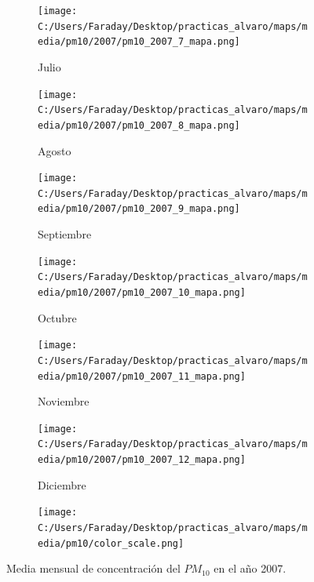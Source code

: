 \documentclass[12pt]{article}
\begin{document}
\begin{figure}[H]
\begin{subfigure}[H]{0.15\textwidth}
\texttt{[image: C:/Users/Faraday/Desktop/practicas\_alvaro/maps/media/pm10/2007/pm10\_2007\_7\_mapa.png]}
\captionsetup{labelformat=empty}
\caption{Julio}
\label{fig:map-pm10-2007-7}
\end{subfigure}
%
\begin{subfigure}[H]{0.15\textwidth}
\texttt{[image: C:/Users/Faraday/Desktop/practicas\_alvaro/maps/media/pm10/2007/pm10\_2007\_8\_mapa.png]}
\captionsetup{labelformat=empty}
\caption{Agosto}
\label{fig:map-pm10-2007-8}
\end{subfigure}
%
\begin{subfigure}[H]{0.15\textwidth}
\texttt{[image: C:/Users/Faraday/Desktop/practicas\_alvaro/maps/media/pm10/2007/pm10\_2007\_9\_mapa.png]}
\captionsetup{labelformat=empty}
\caption{Septiembre}
\label{fig:map-pm10-2007-9}
\end{subfigure}
%
\begin{subfigure}[H]{0.15\textwidth}
\texttt{[image: C:/Users/Faraday/Desktop/practicas\_alvaro/maps/media/pm10/2007/pm10\_2007\_10\_mapa.png]}
\captionsetup{labelformat=empty}
\caption{Octubre}
\label{fig:map-pm10-2007-10}
\end{subfigure}
%
\begin{subfigure}[H]{0.15\textwidth}
\texttt{[image: C:/Users/Faraday/Desktop/practicas\_alvaro/maps/media/pm10/2007/pm10\_2007\_11\_mapa.png]}
\captionsetup{labelformat=empty}
\caption{Noviembre}
\label{fig:map-pm10-2007-11}
\end{subfigure}
%
\begin{subfigure}[H]{0.15\textwidth}
\texttt{[image: C:/Users/Faraday/Desktop/practicas\_alvaro/maps/media/pm10/2007/pm10\_2007\_12\_mapa.png]}
\captionsetup{labelformat=empty}
\caption{Diciembre}
\label{fig:map-pm10-2007-12}
\end{subfigure}

\begin{subfigure}[H]{0.45\textwidth}
\texttt{[image: C:/Users/Faraday/Desktop/practicas\_alvaro/maps/media/pm10/color\_scale.png]}
\captionsetup{labelformat=empty}
\caption{}
\end{subfigure}

\vspace*{-7mm}
\caption{Media mensual de concentración del $PM_{10}$ en el año 2007.}
\label{fig:map-pm10-2007}
\end{figure}
\end{document}

